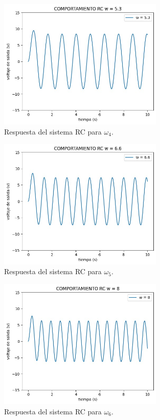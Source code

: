\documentclass{article}
\begin{document}
\begin{figure}[H]
    \centering
    \includegraphics[width=0.7\textwidth]{OMw4RC.jpg}
    \caption{Respuesta del sistema RC para $\omega_4$.}
\end{figure}

\begin{figure}[H]
    \centering
    \includegraphics[width=0.7\textwidth]{OMw5RC.jpg}
    \caption{Respuesta del sistema RC para $\omega_5$.}
\end{figure}

\begin{figure}[H]
    \centering
    \includegraphics[width=0.7\textwidth]{OMw6RC.jpg}
    \caption{Respuesta del sistema RC para $\omega_6$.}
\end{figure}
\end{document}
